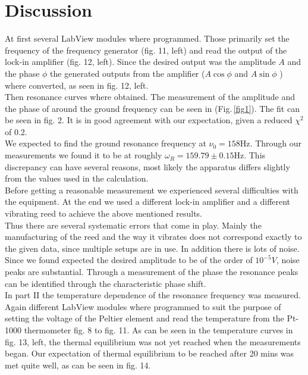 \section{Discussion}
At first several LabView modules where programmed. Those primarily set the frequency of the frequency generator (fig. 11, left) and read the output of the lock-in amplifier (fig. 12, left). Since the desired output was the amplitude $A$ and the phase $\phi$ the generated outputs from the amplifier ($A \cos \phi$ and $A \sin \phi$ ) where converted, as seen in fig. 12, left.\\
Then resonance curves where obtained. The measurement of the amplitude and the phase of around the ground frequency can be seen in (Fig.\,\ref{fig1}). The fit can be seen in fig. 2. It is in good agreement with our expectation, given a reduced $\chi^2$ of 0.2.\\
We expected to find the ground resonance frequency at $\nu_0 = 158 \mathrm{Hz}$. Through our measurements we found it to be at roughly $\omega_R = 159.79 \pm 0.15$Hz. This discrepancy can have several reasons, most likely the apparatus differs slightly from the values used in the calculation.\\
Before getting a reasonable measurement we experienced several difficulties with the equipment. At the end we used a different lock-in amplifier and a different vibrating reed to achieve the above mentioned results.\\
Thus there are several systematic errors that come in play. Mainly the manufacturing of the reed and the way it vibrates does not correspond exactly to the given data, since multiple setups are in use. In addition there is lots of noise. Since we found expected the desired amplitude to be of the order of $10^{-5} V$, noise peaks are substantial. Through a measurement of the phase the resonance peaks can be identified through the characteristic phase shift.  
\\
In part II the temperature dependence of the resonance frequency was measured. Again different LabView modules where programmed to suit the purpose of setting the voltage of the Peltier element and read the temperature from the Pt-1000 thermometer fig. 8 to fig. 11. As can be seen in the temperature curves in fig. 13, left, the thermal equilibrium was not yet reached when the measurements began. Our expectation of thermal equilibrium to be reached after 20 mins was met quite well, as can be seen in fig. 14.
